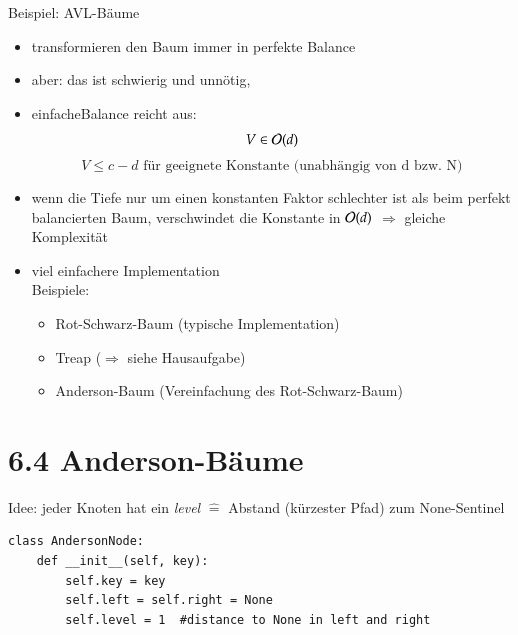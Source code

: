 Beispiel: AVL-Bäume
\begin{itemize}
    \item transformieren den Baum immer in perfekte Balance
    \item aber: das ist schwierig und unnötig,
\end{itemize}
\begin{itemize}[label={$\Rightarrow$}]
    \item \glqq einfache\grqq Balance reicht aus: \[ V \in \mathcal{O}{}(d)\]
    \[ V \leq c - d \text{ für geeignete Konstante (unabhängig von d bzw. N)}\]
    \item wenn die Tiefe nur um einen konstanten Faktor schlechter ist als beim perfekt balancierten Baum, verschwindet die Konstante in $\mathcal{O}{}(d)$ $\Rightarrow$ gleiche Komplexität
    \item viel einfachere Implementation \\
    Beispiele:
    \begin{itemize}
        \item Rot-Schwarz-Baum (typische Implementation)
        \item Treap ($\Rightarrow$ siehe Hausaufgabe)
        \item Anderson-Baum (Vereinfachung des Rot-Schwarz-Baum)
    \end{itemize}
\end{itemize}

\section*{6.4 Anderson-Bäume}
Idee: jeder Knoten hat ein \emph{level} $\widehat{=}$ Abstand (kürzester Pfad) zum None-Sentinel

\begin{verbatim}
class AndersonNode:
    def __init__(self, key):
        self.key = key
        self.left = self.right = None
        self.level = 1  #distance to None in left and right
\end{verbatim}

